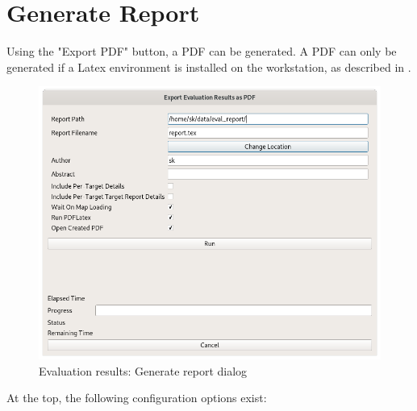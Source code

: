 \section{Generate Report}
\label{sec:eval_report}

Using the "Export PDF" button, a PDF can be generated. A PDF can only be generated if a Latex environment is installed on the workstation, as described in .

\begin{figure}[H]
    \includegraphics[width=14cm]{figures/eval_report.png}
  \caption{Evaluation results: Generate report dialog}
\end{figure}

At the top, the following configuration options exist:

